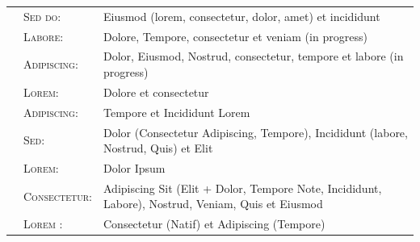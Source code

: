 \begin{tabular}{>{}l>{}p{13cm}}
	\textsc{\faBilibili \ \ Sed do:}	& Eiusmod (lorem, consectetur, dolor, amet) et incididunt
	\vspace{0.2cm}\\
	\textsc{\faDocker \ \ Labore:}	& Dolore, Tempore, consectetur et veniam (in progress)
	\vspace{0.2cm}\\
	\textsc{\faDebian \ \ Adipiscing:}	& Dolor, Eiusmod, Nostrud, consectetur, tempore et labore (in progress)
	\vspace{0.2cm}\\
	\textsc{\faBookBookmark \ \ Lorem:}	& Dolore et consectetur
	\vspace{0.2cm}\\
	\textsc{\faTag \ \ Adipiscing:}	& Tempore et Incididunt Lorem
	\vspace{0.2cm}\\
	\textsc{\faMicrochip \ \ Sed:}	& Dolor (Consectetur Adipiscing, Tempore), Incididunt (labore, Nostrud, Quis) et Elit 
	\vspace{0.2cm}\\
	\textsc{\faFilePen \ \ Lorem:}	& Dolor Ipsum
	\vspace{0.2cm}\\
	\textsc{\faPencil \ \ Consectetur:}	 &   Adipiscing Sit (Elit + Dolor, Tempore Note, Incididunt, Labore), Nostrud, Veniam, Quis et Eiusmod \vspace{0.1cm}\\
	\textsc{\faLanguage \ \ Lorem :}	& Consectetur (Natif) et Adipiscing (Tempore)
\end{tabular}
